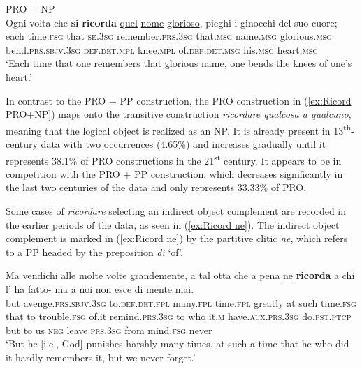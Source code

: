 \documentclass[output=paper,colorlinks,citecolor=brown]{langscibook}
\begin{document}
\begin{exe}
\ex PRO + NP\\ \label{ex:Ricord PRO+NP}
    \gll Ogni volta che \textbf{si} \textbf{ricorda} \ul{quel} \ul{nome} \ul{glorioso}, pieghi i ginocchi del suo cuore;\\
    each time.\textsc{fsg} that \textsc{se}.\textsc{3sg} remember.\textsc{prs.3sg} that.\textsc{msg} name.\textsc{msg} glorious.\textsc{msg} bend.\textsc{prs.sbjv.3sg}	\textsc{def.det.mpl} knee.\textsc{mpl} of.\textsc{def.det.msg} his.\textsc{msg} heart.\textsc{msg} \\ 
    \glt ‘Each time that one remembers that glorious name, one bends the knees of one’s heart.’
\end{exe}

In contrast to the PRO + PP construction, the PRO construction in (\ref{ex:Ricord PRO+NP}) maps onto the transitive construction \textit{ricordare qualcosa a qualcuno}, meaning that the logical object is realized as an NP. It is already present in 13\textsuperscript{th}-century data with two occurrences (4.65\%) and increases gradually until it represents 38.1\% of PRO constructions in the 21\textsuperscript{st} century. It appears to be in competition with the PRO + PP construction, which decreases significantly in the last two centuries of the data and only represents 33.33\% of PRO.

Some cases of \textit{ricordare} selecting an indirect object complement are recorded in the earlier periods of the data, as seen in (\ref{ex:Ricord ne}). The indirect object complement is marked in (\ref{ex:Ricord ne}) by the partitive clitic \textit{ne}, which refers to a PP headed by the preposition \textit{di} ‘of’.

\begin{exe}
\ex \label{ex:Ricord ne}
    \gll Ma vendichi alle molte volte grandemente, a tal otta che a pena \ul{ne} \textbf{ricorda} a chi l' ha fatto- ma a noi non esce di mente mai.\\
    but avenge.\textsc{prs.sbjv.3sg} to.\textsc{def.det.fpl} many.\textsc{fpl} time.\textsc{fpl} greatly at such time.\textsc{fsg} that to trouble.\textsc{fsg} of.it remind.\textsc{prs.3sg} to who it.\textsc{m} have.\textsc{aux.prs.3sg} do.\textsc{pst.ptcp} but to us \textsc{neg} leave.\textsc{prs.3sg} from mind.\textsc{fsg} never \\ 
    \glt ‘But he [i.e., God] punishes harshly many times, at such a time that he who did it hardly remembers it, but we never forget.’
\end{exe}
\end{document}
